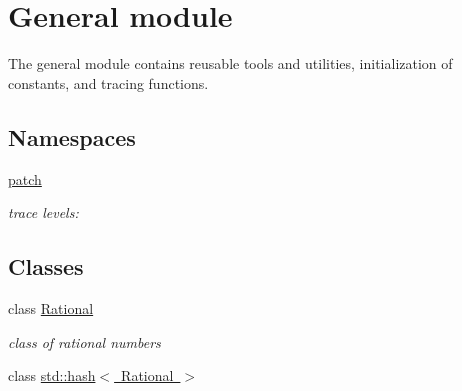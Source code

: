 \hypertarget{group__general}{}\section{General module}
\label{group__general}


The {\ttfamily general} module contains reusable tools and utilities, initialization of constants, and tracing functions.  


\subsection*{Namespaces}
\begin{DoxyCompactItemize}
\item 
 \mbox{\hyperlink{namespacepatch}{patch}}
\begin{DoxyCompactList}\small\item\em trace levels\+: \end{DoxyCompactList}\end{DoxyCompactItemize}
\subsection*{Classes}
\begin{DoxyCompactItemize}
\item 
class \mbox{\hyperlink{classRational}{Rational}}
\begin{DoxyCompactList}\small\item\em class of rational numbers \end{DoxyCompactList}\item 
class \mbox{\hyperlink{classstd_1_1hash_3_01Rational_01_4}{std\+::hash$<$ Rational $>$}}
\end{DoxyCompactItemize}
